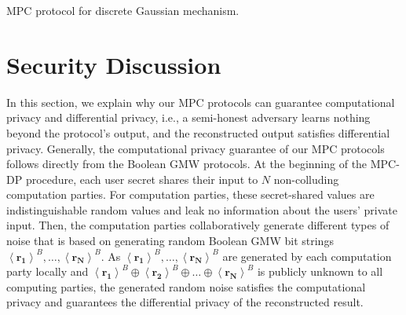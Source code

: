       \begin{protocol}[tbh!]
            \centering
            \caption{MPC protocol for discrete Gaussian mechanism.}
            \label{prot:DGaussMechanism}
      \end{protocol}
      \FloatBarrier


      \section{Security Discussion}
      \label{SecurityDiscussion}

      In this section, we explain why our MPC protocols can guarantee computational privacy and differential privacy, i.e., a semi-honest adversary learns nothing beyond the protocol's output, and the reconstructed output satisfies differential privacy. Generally, the computational privacy guarantee of our MPC protocols follows directly from the Boolean GMW protocols. At the beginning of the MPC-DP procedure, each user secret shares their input to $ N$ non-colluding computation parties. For computation parties, these secret-shared values are indistinguishable random values and leak no information about the users' private input. Then, the computation parties collaboratively generate different types of noise that is based on generating random Boolean GMW bit strings $\left\langle \boldsymbol{r_1}\right\rangle^B, \ldots, \left\langle \boldsymbol{r_{N}}\right\rangle^B $. As $\left\langle \boldsymbol{r_1}\right\rangle^B, \ldots, \left\langle \boldsymbol{r_{N}}\right\rangle^B$ are generated by each computation party locally and $\left\langle \boldsymbol{r_1}\right\rangle^B \oplus \left\langle \boldsymbol{r_2}\right\rangle^B \oplus  \ldots \oplus  \left\langle \boldsymbol{r_{N}}\right\rangle^B$ is publicly unknown to all computing parties, the generated random noise satisfies the computational privacy and guarantees the differential privacy of the reconstructed result.




